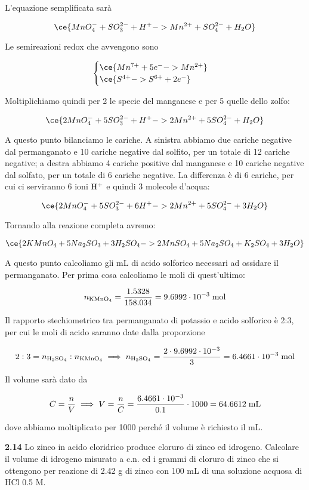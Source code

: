 L'equazione semplificata sarà

$$\ce{MnO_4^- + SO_3^{2-} + H^+ -> Mn^{2+} + SO_4^{2-} + H_2O}$$

Le semireazioni redox che avvengono sono

$$\begin{cases}
\ce{Mn^{7+} + 5e^- -> Mn^{2+}}\\
\ce{S^{4+} -> S^{6+} + 2e^-}
\end{cases}$$

Moltiplichiamo quindi per 2 le specie del manganese e per 5 quelle dello zolfo:

$$\ce{2MnO_4^- + 5SO_3^{2-} + H^+ -> 2Mn^{2+} + 5SO_4^{2-} + H_2O}$$

A questo punto bilanciamo le cariche. A sinistra abbiamo due cariche negative dal permanganato e 10 cariche negative dal solfito, per un totale di 12 cariche negative; a destra abbiamo 4 cariche positive dal manganese e 10 cariche negative dal solfato, per un totale di 6 cariche negative. La differenza è di 6 cariche, per cui ci serviranno 6 ioni $\rm H^+$ e quindi 3 molecole d'acqua:

$$\ce{2MnO_4^- + 5SO_3^{2-} + 6H^+ -> 2Mn^{2+} + 5SO_4^{2-} + 3H_2O}$$

Tornando alla reazione completa avremo:

$$\ce{2KMnO_4 + 5Na_2SO_3 + 3H_2SO_4 -> 2MnSO_4 + 5Na_2SO_4 + K_2SO_4 + 3H_2O}$$

A questo punto calcoliamo gli mL di acido solforico necessari ad ossidare il permanganato. Per prima cosa calcoliamo le moli di quest'ultimo:

$$n_{\rm KMnO_4}=\frac{1.5328}{158.034}
=9.6992 \cdot 10^{-3} \; \rm mol$$

Il rapporto stechiometrico tra permanganato di potassio e acido solforico è 2:3, per cui le moli di acido saranno date dalla proporzione

$$2:3=n_{\rm H_2SO_4}:n_{\rm KMnO_4}
\implies
n_{\rm H_2SO_4}=\frac{2 \cdot 9.6992 \cdot 10^{-3}}{3}
=6.4661 \cdot 10^{-3} \; \rm mol$$

Il volume sarà dato da

$$C=\frac{n}{V}
\implies
V=\frac{n}{C}=\frac{6.4661 \cdot 10^{-3}}{0.1} \cdot 1000
=64.6612 \; \rm mL$$

dove abbiamo moltiplicato per 1000 perché il volume è richiesto il mL.

\newpage

\vspace{0.2cm}\textbf{2.14} Lo zinco in acido cloridrico produce cloruro di zinco ed idrogeno. Calcolare il volume di
idrogeno misurato a c.n. ed i grammi di cloruro di zinco che si ottengono per reazione di 2.42 g di zinco con 100 mL di una soluzione acquosa di HCl 0.5 M.

